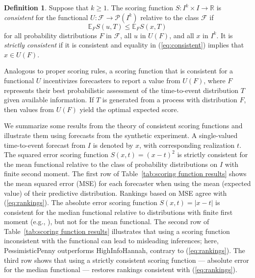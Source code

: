 \documentclass[10pt]{article} %
\theoremstyle{theorem}
\theoremstyle{definition}
\newtheorem{defn}{Definition}
\newcommand{\RRR}{\mathbb{R}}
\newcommand{\EEE}{\mathbb{E}}
\begin{document}
\begin{defn}\label{def:consistent}
Suppose that $k\geq 1$. The scoring function $S: I^k \times I \to \RRR$ is \textit{consistent} for the functional $U: \mathcal{F}\to\mathcal{P}(I^k)$ relative to the class $\mathcal{F}$ if
\begin{equation}\label{eq:consistent}
\EEE_F S(u, T) \leq \EEE_F S(x, T)
\end{equation}
for all probability distributions $F$ in $\mathcal{F}$, all $u$ in $U(F)$, and all $x$ in $I^k$. It is \textit{strictly consistent} if it is consistent and equality in (\ref{eq:consistent}) implies that $x\in U(F)$.
\end{defn}

Analogous to proper scoring rules, a scoring function that is consistent for a functional $U$ incentivizes forecasters to report a value from $U(F)$, where $F$ represents their best probabilistic assessment of the time-to-event distribution $T$ given available information. If $T$ is generated from a process with distribution $F$, then values from $U(F)$ yield the optimal expected score.

We summarize some results from the theory of consistent scoring functions \citep{gneiting2011making} and illustrate them using forecasts from the synthetic experiment. A single-valued time-to-event forecast from $I$ is denoted by $x$, with corresponding realization $t$. The squared error scoring function $S(x,t) = (x - t)^2$ is strictly consistent for the mean functional relative to the class of probability distributions on $I$ with finite second moment. The first row of Table~\ref{tab:scoring function results} shows the mean squared error (MSE) for each forecaster when using the mean (expected value) of their predictive distribution. Rankings based on MSE agree with (\ref{eq:rankings}). The absolute error scoring function $S(x,t) = |x - t|$ is consistent for the median functional relative to distributions with finite first moment (e.g., \citealp{raiffa1961applied}), but not for the mean functional. The second row of Table~\ref{tab:scoring function results} illustrates that using a scoring function inconsistent with the functional can lead to misleading inferences; here, PessimisticPenny outperforms HighInfoHannah, contrary to (\ref{eq:rankings}). The third row shows that using a strictly consistent scoring function --- absolute error for the median functional --- restores rankings consistent with (\ref{eq:rankings}).
\end{document}
